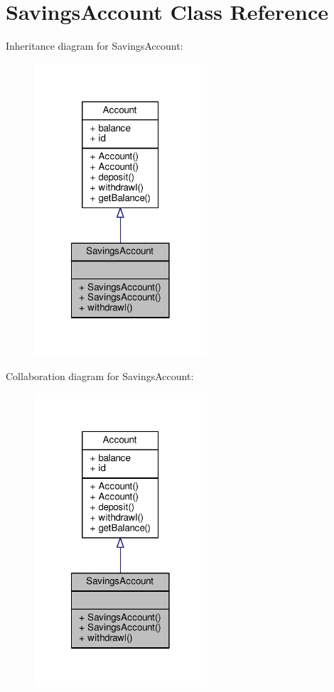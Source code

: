 \hypertarget{classSavingsAccount}{\section{Savings\-Account Class Reference}
\label{classSavingsAccount}
}


Inheritance diagram for Savings\-Account\-:
\nopagebreak
\begin{figure}[H]
\begin{center}
\leavevmode
\includegraphics[width=182pt]{classSavingsAccount__inherit__graph}
\end{center}
\end{figure}


Collaboration diagram for Savings\-Account\-:
\nopagebreak
\begin{figure}[H]
\begin{center}
\leavevmode
\includegraphics[width=182pt]{classSavingsAccount__coll__graph}
\end{center}
\end{figure}
